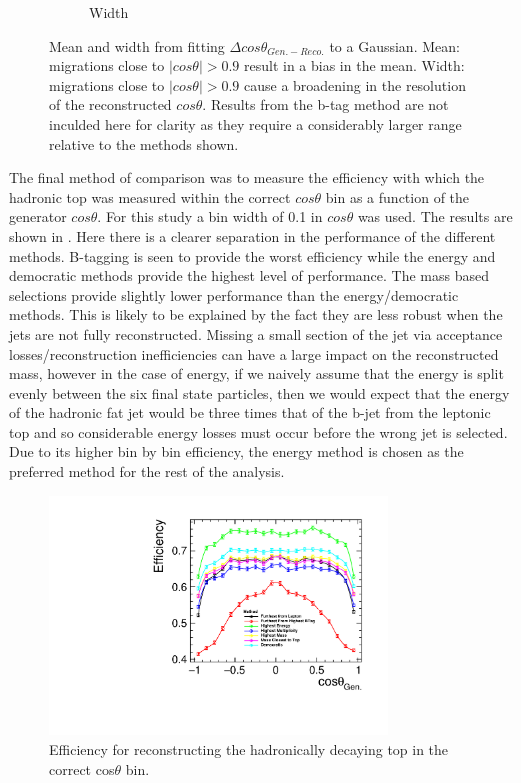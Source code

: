 \begin{figure}
\begin{subfigure}{.8\textwidth}
    \caption[Width]{Width}
  \end{subfigure}
  \caption[Mean and width from fitting $\Delta cos\theta_{Gen.-Reco.}$ to a Gaussian]{Mean and width from fitting $\Delta cos\theta_{Gen.-Reco.}$ to a Gaussian. Mean: migrations close to $\mid cos\theta\mid>0.9$ result in a bias in the mean. Width: migrations close to $\mid cos\theta\mid>0.9$ cause a broadening in the resolution of the reconstructed $cos\theta$. Results from the b-tag method are not inculded here for clarity as they require a considerably larger range relative to the methods shown.}
  \label{fig:angleFitDiff}
\end{figure}

The final method of comparison was to measure the efficiency with which the hadronic top was measured within the correct $cos\theta$ bin as a function of the generator $cos\theta$. For this study a bin width of 0.1 in $cos\theta$ was used. The results are shown in . Here there is a clearer separation in the performance of the different methods. B-tagging is seen to provide the worst efficiency while the energy and democratic methods provide the highest level of performance. The mass based selections provide slightly lower performance than the energy/democratic methods. This is likely to be explained by the fact they are less robust when the jets are not fully reconstructed. Missing a small section of the jet via acceptance losses/reconstruction inefficiencies can have a large impact on the reconstructed mass, however in the case of energy, if we naively assume that the energy is split evenly between the six final state particles, then we would expect that the energy of the hadronic fat jet would be three times that of the b-jet from the leptonic top and so considerable energy losses must occur before the wrong jet is selected. Due to its higher bin by bin efficiency, the energy method is chosen as the preferred method for the rest of the analysis. 

\begin{figure}
  \centering
  \includegraphics[width=0.8\textwidth]{TopAnalysis/figures/EfficiencyvsMCTheta.pdf}
  \caption[Efficiency for reconstructing the hadronically decaying top in the correct cos$\theta$ bin]{Efficiency for reconstructing the hadronically decaying top in the correct cos$\theta$ bin.}
  \label{fig:angularEfficiency}
\end{figure}

